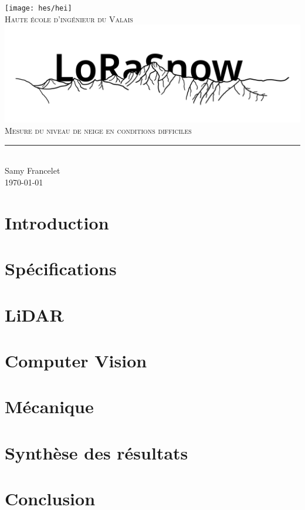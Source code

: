 \documentclass[11pt,titlepage]{report}
\begin{document}
\begin{titlepage}
	\centering
    \texttt{[image: hes/hei]}\\[1cm] 	%
    \textsc{\LARGE Haute école d'ingénieur du Valais}\\ \vspace{\fill}
    \includegraphics[width=1\linewidth]{Images/Logo_LoRaSnow.png}\\ \vspace{\fill}
	\textsc{\LARGE Mesure du niveau de neige en conditions difficiles}\\[0.4cm]
	\rule{\linewidth}{0.2 mm} \\[0.5 cm]
	Samy Francelet \\
	\today
\end{titlepage}
\restoregeometry

\tableofcontents
\listoffigures
\listoftables

\chapter{Introduction}


\chapter{Spécifications}


\chapter{LiDAR}



\chapter{Computer Vision}




\chapter{Mécanique}


\chapter{Synthèse des résultats}


\chapter{Conclusion}


\printbibliography[heading=bibintoc]
\end{document}
